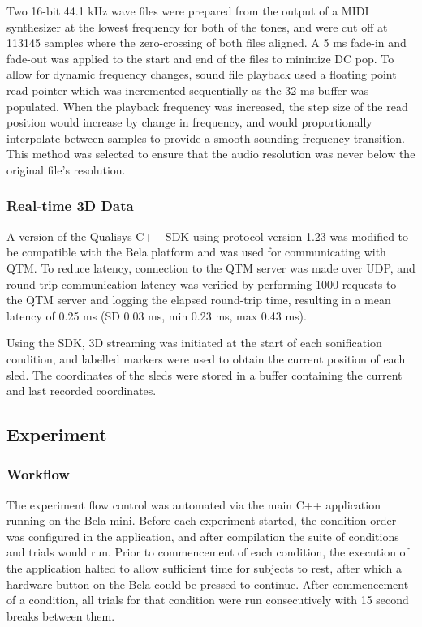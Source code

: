\documentclass[10pt,a4paper,onecolumn]{article}
\begin{document}
Two 16-bit 44.1 kHz wave files were prepared from the output of a MIDI synthesizer at the lowest frequency for both of the tones, and were cut off at 113145 samples where the zero-crossing of both files aligned. A 5 ms fade-in and fade-out was applied to the start and end of the files to minimize DC pop. To allow for dynamic frequency changes, sound file playback used a floating point read pointer which was incremented sequentially as the 32 ms buffer was populated. When the playback frequency was increased, the step size of the read position would increase by change in frequency, and would proportionally interpolate between samples to provide a smooth sounding frequency transition. This method was selected to ensure that the audio resolution was never below the original file's resolution.

\hypertarget{real-time-3d-data}{%
\subsubsection{Real-time 3D Data}\label{real-time-3d-data}}

A version of the Qualisys C++ SDK using protocol version 1.23 was modified to be compatible with the Bela platform and was used for communicating with QTM. To reduce latency, connection to the QTM server was made over UDP, and round-trip communication latency was verified by performing 1000 requests to the QTM server and logging the elapsed round-trip time, resulting in a mean latency of 0.25 ms (SD 0.03 ms, min 0.23 ms, max 0.43 ms).

Using the SDK, 3D streaming was initiated at the start of each sonification condition, and labelled markers were used to obtain the current position of each sled. The coordinates of the sleds were stored in a buffer containing the current and last recorded coordinates.

\hypertarget{experiment}{%
\subsection{Experiment}\label{experiment}}

\hypertarget{workflow}{%
\subsubsection{Workflow}\label{workflow}}

The experiment flow control was automated via the main C++ application running on the Bela mini. Before each experiment started, the condition order was configured in the application, and after compilation the suite of conditions and trials would run. Prior to commencement of each condition, the execution of the application halted to allow sufficient time for subjects to rest, after which a hardware button on the Bela could be pressed to continue. After commencement of a condition, all trials for that condition were run consecutively with 15 second breaks between them.
\end{document}
